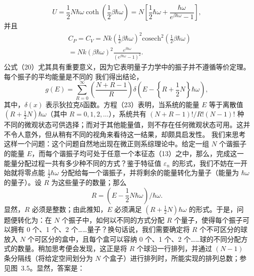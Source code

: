 \begin{equation}\tag{3.5.72}\label{eq:3.5.72}
U = \frac { 1 } { 2 } N \hbar \omega \coth \left( \frac { 1 } { 2 } \beta \hbar \omega \right) = N \left[ \frac { 1 } { 2 } \hbar \omega + \frac { \hbar \omega } { e ^{\beta \hbar \omega} - 1 } \right] ,
\end{equation}
并且
\begin{equation}\tag{3.5.73}\label{eq:3.5.73}
\begin{array}{rl} & { C _ { P } = C _ { V } = N k \left( \frac { 1 } { 2 } \beta \hbar \omega \right) ^{2} \mathrm { c o s e c h } ^{2} \left( \frac { 1 } { 2 } \beta \hbar \omega \right) } \\& { = N k ( \beta \hbar \omega ) ^{2} \frac { e ^{\beta \hbar \omega} } { ( e ^{\beta \hbar \omega} - 1 ) ^{2} } . } \end{array}
\end{equation}
公式（20）尤其具有重要意义，因为它表明量子力学中的振子并不遵循等价定理。每个振子的平均能量是不同的
我们得出结论，
\begin{equation}\tag{3.5.74}\label{eq:3.5.74}
g ( E ) = \sum _ { R = 0 } ^{\infty} \left( \frac { N + R - 1 } { R } \right) \delta \left( E - \left\{ R + \frac { 1 } { 2 } N \right\} \hbar \omega \right) ,
\end{equation}
其中，\(\delta(x)\) 表示狄拉克δ函数。方程（23）表明，当系统的能量 \(E\) 等于离散值 \((R+\frac{1}{2}N)\hbar\omega\)（其中 \(R=0,1,2,\ldots\)），系统共有 \((N+R-1)!/R!(N-1)!\) 种不同的微观状态可供选择；而对于其他能量值，则不存在任何微观状态可用。这并不令人意外，但从稍有不同的视角来看待这一结果，却颇具启发性。
我们来思考这样一个问题：这个问题自然地出现在微正则系综理论中。给定一组 \(N\) 个谐振子的能量 \(E\)，而每个谐振子均可处于任意一个本征态（13）之中，那么，完成这一能量分配过程一共有多少种不同的方式？鉴于特征值 \(\varepsilon_{n}\) 的形式，我们不妨在一开始就将零点能 \(\frac{1}{2}\hbar\omega\) 分配给每一个谐振子，并将剩余的能量转化为量子（能量为 \(\hbar\omega\) 的量子）。设 \(R\) 为这些量子的数量；那么
\begin{equation}\tag{3.5.75}\label{eq:3.5.75}
R = \left( E - \frac { 1 } { 2 } N \hbar \omega \right) \Bigg / \hbar \omega .
\end{equation}
显然，\(R\) 必须是整数；由此推知，\(E\) 必须满足 \((R+\frac{1}{2}N)\hbar\omega\) 的形式。于是，问题便转化为：在 \(N\) 个振子中，如何以不同的方式分配 \(R\) 个量子，使得每个振子可以拥有 0 个、1 个、2 个\ldots\ldots 量子？换句话说，我们需要确定将 \(R\) 个不可区分的球放入 \(N\) 个可区分的盒中，且每个盒可以容纳 0 个、1 个、2 个\ldots\ldots 球的不同分配方式的数量。稍加思考便会发现，这正是将 \(R\) 个球沿一行排列，并通过 \((N-1)\) 条分隔线（将给定空间划分为 \(N\) 个盒子）进行排列时，所能实现的排列总数；参见图~3.5。显然，答案是：
